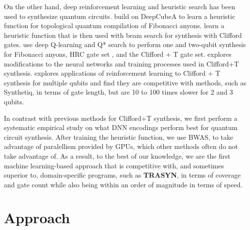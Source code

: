 \documentclass[letterpaper]{article} %
\begin{document}
On the other hand, deep reinforcement learning and heuristic search has been used to synthesize quantum circuits. \citet{zhang2020topological} build on DeepCubeA to learn a heuristic function for topological quantum compilation of Fibonacci anyons. \cite{bao2024twisty} learn a heuristic function that is then used with beam search for synthesis with Clifford gates. \cite{chen2024efficient} use deep Q-learning \cite{watkins1992q,mnih2015human} and Q* search \cite{agostinelli2024q} to perform one and two-qubit synthesis for Fibonacci anyons, HRC gate set \cite{harrow2002efficient}, and the Clifford + T gate set. \citet{weiden2025making} explores modifications to the neural networks
and training processes used in Clifford+T synthesis.  \citet{rietsch2024unitary} explores applications of reinforcement learning to Clifford + T synthesis for multiple qubits and find they are competitive with methods, such as Synthetiq, in terms of gate length, but are 10 to 100 times slower for 2 and 3 qubits. 

In contrast with previous methods for Clifford+T synthesis, we first perform a systematic empirical study on what DNN encodings perform best for quantum circuit synthesis. After training the heuristic function, we use BWAS, to take advantage of paralellism provided by GPUs, which other methods often do not take advantage of. As a result, to the best of our knowledge, we are the first machine learning-based approach that is competitive with, and sometimes superior to, domain-specific programs, such as \textbf{TRASYN}, in terms of coverage and gate count while also being within an order of magnitude in terms of speed. 





\section{Approach}
\end{document}
